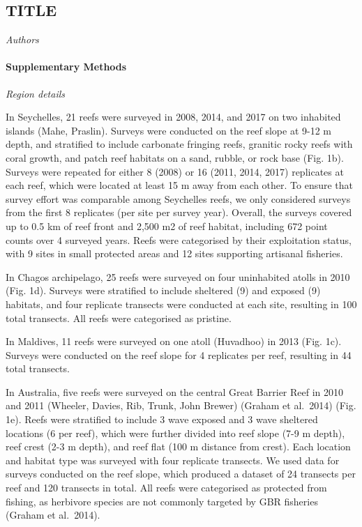 \documentclass[12pt,]{article}
\title{}
\author{}
\date{}
\let\oldparagraph\paragraph
\renewcommand{\paragraph}[1]{\oldparagraph{#1}\mbox{}}
\begin{document}
\hypertarget{title}{%
\subsection{TITLE}\label{title}}

\emph{Authors}

\hypertarget{supplementary-methods}{%
\paragraph{Supplementary Methods}\label{supplementary-methods}}

\emph{Region details}

In Seychelles, 21 reefs were surveyed in 2008, 2014, and 2017 on two
inhabited islands (Mahe, Praslin). Surveys were conducted on the reef
slope at 9-12 m depth, and stratified to include carbonate fringing
reefs, granitic rocky reefs with coral growth, and patch reef habitats
on a sand, rubble, or rock base (Fig. 1b). Surveys were repeated for
either 8 (2008) or 16 (2011, 2014, 2017) replicates at each reef, which
were located at least 15 m away from each other. To ensure that survey
effort was comparable among Seychelles reefs, we only considered surveys
from the first 8 replicates (per site per survey year). Overall, the
surveys covered up to 0.5 km of reef front and 2,500 m2 of reef habitat,
including 672 point counts over 4 surveyed years. Reefs were categorised
by their exploitation status, with 9 sites in small protected areas and
12 sites supporting artisanal fisheries.

In Chagos archipelago, 25 reefs were surveyed on four uninhabited atolls
in 2010 (Fig. 1d). Surveys were stratified to include sheltered (9) and
exposed (9) habitats, and four replicate transects were conducted at
each site, resulting in 100 total transects. All reefs were categorised
as pristine.

In Maldives, 11 reefs were surveyed on one atoll (Huvadhoo) in 2013
(Fig. 1c). Surveys were conducted on the reef slope for 4 replicates per
reef, resulting in 44 total transects.

In Australia, five reefs were surveyed on the central Great Barrier Reef
in 2010 and 2011 (Wheeler, Davies, Rib, Trunk, John Brewer) (Graham et
al.~2014) (Fig. 1e). Reefs were stratified to include 3 wave exposed and
3 wave sheltered locations (6 per reef), which were further divided into
reef slope (7-9 m depth), reef crest (2-3 m depth), and reef flat (100 m
distance from crest). Each location and habitat type was surveyed with
four replicate transects. We used data for surveys conducted on the reef
slope, which produced a dataset of 24 transects per reef and 120
transects in total. All reefs were categorised as protected from
fishing, as herbivore species are not commonly targeted by GBR fisheries
(Graham et al.~2014).
\end{document}
